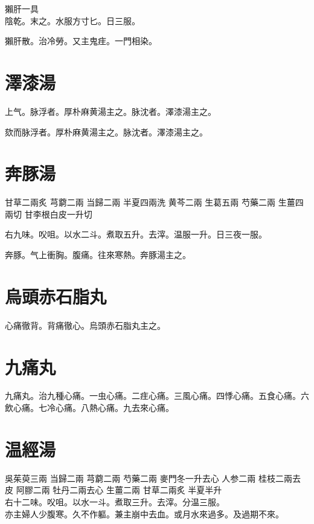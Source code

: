 獺肝{\scriptsize 一具}\\
陰乾。末之。水服方寸匕。日三服。

獺肝散。治冷勞。又主鬼疰。一門相染。

\section{澤漆湯}

上气。脉浮者。厚朴麻黄湯主之。脉沈者。澤漆湯主之。{\wuben}

欬而脉浮者。厚朴麻黄湯主之。脉沈者。澤漆湯主之。{\dengben}

\section{奔豚湯}

甘草{\scriptsize 二兩{\khaaitp 炙}} 芎藭{\scriptsize 二兩} 当歸{\scriptsize 二兩} 半夏{\scriptsize 四兩{\khaaitp 洗}} 黄芩{\scriptsize 二兩} 生葛{\scriptsize 五兩} 芍藥{\scriptsize 二兩} 生薑{\scriptsize 四兩{\khaaitp 切}} 甘李根白皮{\scriptsize 一升{\khaaitp 切}}

右九味。{\khaaitp 㕮咀。}以水二斗。煮取五升。{\khaaitp 去滓。}温服一升。日三夜一服。

奔豚。气上衝胸。腹痛。往來寒熱。奔豚湯主之。

\section{烏頭赤石脂丸}

心痛徹背。背痛徹心。烏頭赤石脂丸主之。

\section{九痛丸}

九痛丸。治九種心痛。一虫心痛。二疰心痛。三風心痛。四悸心痛。五食心痛。六飲心痛。七冷心痛。八熱心痛。九去來心痛。

\section{温經湯}

吳茱萸{\scriptsize 三兩} 当歸{\scriptsize 二兩} 芎藭{\scriptsize 二兩} 芍藥{\scriptsize 二兩} 麥門冬{\scriptsize 一升去心} 人参{\scriptsize 二兩} 桂枝{\scriptsize 二兩去皮} 阿膠{\scriptsize 二兩} 牡丹{\scriptsize 二兩去心} 生薑{\scriptsize 二兩} 甘草{\scriptsize 二兩炙} 半夏{\scriptsize 半升}\\
右十二味。㕮咀。以水一斗。煮取三升。去滓。分温三服。\\
亦主婦人少腹寒。久不作軀。兼主崩中去血。或月水來過多。及過期不來。

